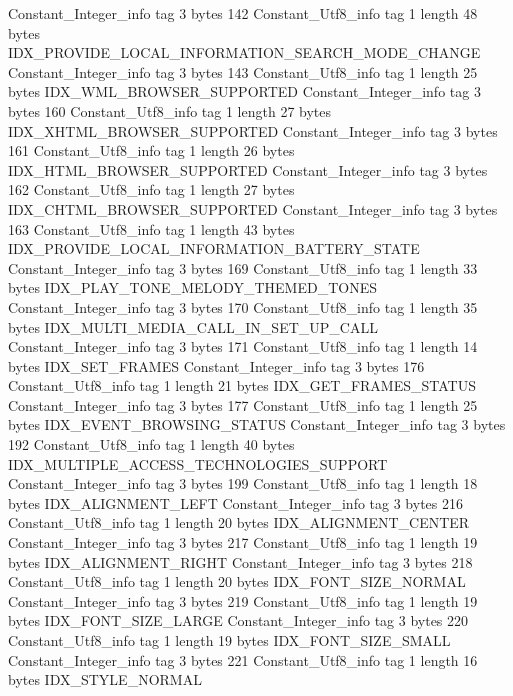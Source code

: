{{{		}
		Constant_Integer_info {
			tag	3
			bytes	142
		}
		Constant_Utf8_info {
			tag	1
			length	48
			bytes	IDX_PROVIDE_LOCAL_INFORMATION_SEARCH_MODE_CHANGE
		}
		Constant_Integer_info {
			tag	3
			bytes	143
		}
		Constant_Utf8_info {
			tag	1
			length	25
			bytes	IDX_WML_BROWSER_SUPPORTED
		}
		Constant_Integer_info {
			tag	3
			bytes	160
		}
		Constant_Utf8_info {
			tag	1
			length	27
			bytes	IDX_XHTML_BROWSER_SUPPORTED
		}
		Constant_Integer_info {
			tag	3
			bytes	161
		}
		Constant_Utf8_info {
			tag	1
			length	26
			bytes	IDX_HTML_BROWSER_SUPPORTED
		}
		Constant_Integer_info {
			tag	3
			bytes	162
		}
		Constant_Utf8_info {
			tag	1
			length	27
			bytes	IDX_CHTML_BROWSER_SUPPORTED
		}
		Constant_Integer_info {
			tag	3
			bytes	163
		}
		Constant_Utf8_info {
			tag	1
			length	43
			bytes	IDX_PROVIDE_LOCAL_INFORMATION_BATTERY_STATE
		}
		Constant_Integer_info {
			tag	3
			bytes	169
		}
		Constant_Utf8_info {
			tag	1
			length	33
			bytes	IDX_PLAY_TONE_MELODY_THEMED_TONES
		}
		Constant_Integer_info {
			tag	3
			bytes	170
		}
		Constant_Utf8_info {
			tag	1
			length	35
			bytes	IDX_MULTI_MEDIA_CALL_IN_SET_UP_CALL
		}
		Constant_Integer_info {
			tag	3
			bytes	171
		}
		Constant_Utf8_info {
			tag	1
			length	14
			bytes	IDX_SET_FRAMES
		}
		Constant_Integer_info {
			tag	3
			bytes	176
		}
		Constant_Utf8_info {
			tag	1
			length	21
			bytes	IDX_GET_FRAMES_STATUS
		}
		Constant_Integer_info {
			tag	3
			bytes	177
		}
		Constant_Utf8_info {
			tag	1
			length	25
			bytes	IDX_EVENT_BROWSING_STATUS
		}
		Constant_Integer_info {
			tag	3
			bytes	192
		}
		Constant_Utf8_info {
			tag	1
			length	40
			bytes	IDX_MULTIPLE_ACCESS_TECHNOLOGIES_SUPPORT
		}
		Constant_Integer_info {
			tag	3
			bytes	199
		}
		Constant_Utf8_info {
			tag	1
			length	18
			bytes	IDX_ALIGNMENT_LEFT
		}
		Constant_Integer_info {
			tag	3
			bytes	216
		}
		Constant_Utf8_info {
			tag	1
			length	20
			bytes	IDX_ALIGNMENT_CENTER
		}
		Constant_Integer_info {
			tag	3
			bytes	217
		}
		Constant_Utf8_info {
			tag	1
			length	19
			bytes	IDX_ALIGNMENT_RIGHT
		}
		Constant_Integer_info {
			tag	3
			bytes	218
		}
		Constant_Utf8_info {
			tag	1
			length	20
			bytes	IDX_FONT_SIZE_NORMAL
		}
		Constant_Integer_info {
			tag	3
			bytes	219
		}
		Constant_Utf8_info {
			tag	1
			length	19
			bytes	IDX_FONT_SIZE_LARGE
		}
		Constant_Integer_info {
			tag	3
			bytes	220
		}
		Constant_Utf8_info {
			tag	1
			length	19
			bytes	IDX_FONT_SIZE_SMALL
		}
		Constant_Integer_info {
			tag	3
			bytes	221
		}
		Constant_Utf8_info {
			tag	1
			length	16
			bytes	IDX_STYLE_NORMAL
}}}
